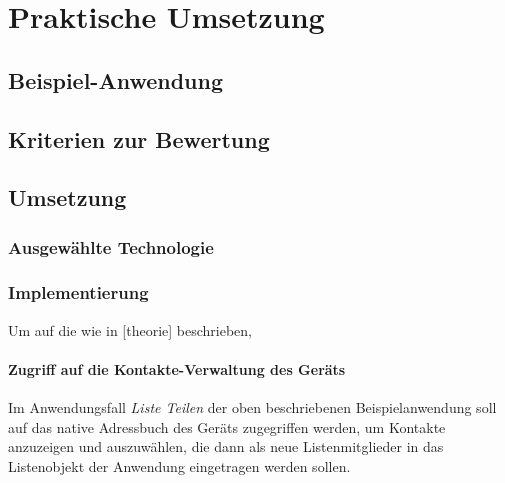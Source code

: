 \chapter{Praktische Umsetzung} %

	\section{Beispiel-Anwendung} %

	\section{Kriterien zur Bewertung}

\section{Umsetzung}

\subsection{Ausgewählte Technologie} %
\subsection{Implementierung} %

Um auf die wie in [theorie] beschrieben, 
		
\subsubsection{Zugriff auf die Kontakte-Verwaltung des Geräts}

Im Anwendungsfall \emph{Liste Teilen} der oben beschriebenen Beispielanwendung soll auf das native Adressbuch des Geräts zugegriffen werden, um Kontakte anzuzeigen und auszuwählen, die dann als neue Listenmitglieder in das Listenobjekt der Anwendung eingetragen werden sollen.

